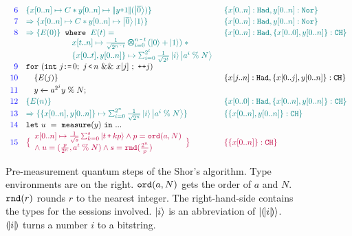 \begin{figure}[t]
{\[\begin{array}{r l l}
\textcolor{blue}{6}
&
\textcolor{teal}{
\{x[0..n] \mapsto C * y[0..n] \mapsto \dabs{y\splus 1}(\ket{\overline{0}}) \}
}
&
\textcolor{teal}{
\{x[0..n]: \thadt, y[0..n]: \tnort\}
}
\\[0.2em]
\textcolor{blue}{7}
&
\textcolor{teal}{
\Rightarrow
\{x[0..n] \mapsto C * y[0..n] \mapsto \ket{\overline{0}}\ket{1} \}
}
&
\textcolor{teal}{
\{x[0..n]: \thadt, y[0..n]: \tnort\}
}
\\[0.2em]
\textcolor{blue}{8}
& 
\textcolor{teal}{
\Rightarrow
\{ E(0) \}
}
\;\;
\texttt{where}\;\;
\textcolor{teal}{E(t) =}
&
\textcolor{teal}{
\{x[0..n]: \thadt, \{x[0..0],y[0..n]\}: \tcht\}
}
\\
&
\qquad\qquad\quad\;
\textcolor{teal}{
\begin{array}{l}
x[t..n] \mapsto \shadi{2^{n \,\sminus\,  t}}{n \,\sminus\, t}{}\;*
\\
\{x[0..t],y[0..n]\} \mapsto \schai{2^t}{\frac{1}{\sqrt{2^t}}}{i}{\ket{a^{i}\;\%\;N}}
\end{array}
}
\\[0.2em]
\textcolor{blue}{9}
&\sqforh{\sint{j}{0}}{j\,\slt\, n}{x[j]}{\dplus{j}}
\\[0.2em]
\textcolor{blue}{10}
&
\quad\{E(j) \}
&
\{x[j..n]: \thadt, \{x[0..j],y[0..n]\}: \tcht\}
\\[0.2em]
\textcolor{blue}{11}
&
\quad\ssassign{y}{}{a^{2^j}y\;\%\; N};
\\[0.2em]
\textcolor{blue}{12}
&
\textcolor{teal}{
\{E(n) \}
}
&
\textcolor{teal}{
\{x[0..0]: \thadt, \{x[0..n],y[0..n]\}: \tcht\}
}
\\[0.2em]
\textcolor{blue}{13}
&
\textcolor{teal}{
\Rightarrow
\{\{x[0..n],y[0..n]\} \mapsto \schai{2^{n}}{\frac{1}{\sqrt{2^{n}}}}{i}{\ket{a^{i}\;\%\;N}} \}
}
&
\textcolor{teal}{
\{\{x[0..n],y[0..n]\}: \tcht\}
}
\\[0.2em]
\textcolor{blue}{14}
& \sexp{u}{\smea{y}}{...}
\\[0.2em]
\textcolor{blue}{15}
&
\textcolor{purple}{
\big{\{}
\begin{array}{l}
x[0..n] \mapsto \smch{\frac{1}{\sqrt{s}}}{s}{t\,\splus\,k p} 
\wedge
p = \texttt{ord}(a,N)
\\
\wedge\;
u=(\frac{p}{2^n},a^{t}\;\%\;N)
\wedge
s=\texttt{rnd}(\frac{2^n}{p})
\end{array}
\big{\}}
}
&
\textcolor{purple}{
\{\{x[0..n]\}: \tcht\}
}
\end{array}
\]
}
\vspace*{-1em}
\caption{Pre-measurement quantum steps of the Shor's algorithm. Type environments are on the right. $\texttt{ord}({a,N})$ gets the order of $a$ and $N$. $\texttt{rnd}({r})$ rounds $r$ to the nearest integer. The right-hand-side contains the types for the sessions involved. $\left\vert{i}\right\rangle$ is an abbreviation of $\left\vert{(\!| i |\!)}\right\rangle$.
$(\!| i |\!)$ turns a number $i$ to a bitstring. }
\label{fig:shorqafny}
\end{figure}

